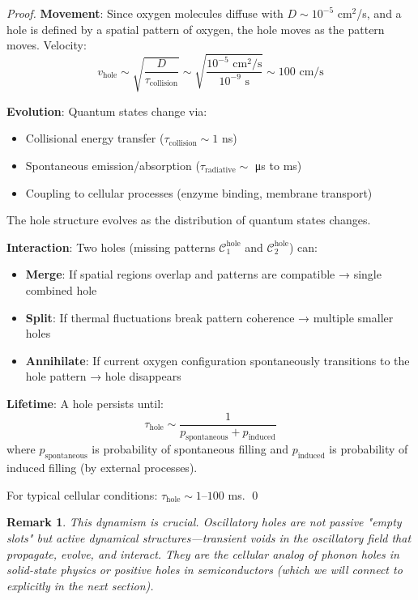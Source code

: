 \documentclass[12pt,a4paper]{article}
\newtheorem{remark}{Remark}
\begin{document}
\begin{proof}
\textbf{Movement}: Since oxygen molecules diffuse with $D \sim 10^{-5}$ cm$^2$/s, and a hole is defined by a spatial pattern of oxygen, the hole moves as the pattern moves. Velocity:
\begin{equation}
v_{\text{hole}} \sim \sqrt{\frac{D}{\tau_{\text{collision}}}} \sim \sqrt{\frac{10^{-5} \text{ cm}^2/\text{s}}{10^{-9} \text{ s}}} \sim 100 \text{ cm/s}
\end{equation}

\textbf{Evolution}: Quantum states change via:
\begin{itemize}
\item Collisional energy transfer ($\tau_{\text{collision}} \sim 1$ ns)
\item Spontaneous emission/absorption ($\tau_{\text{radiative}} \sim$ μs to ms)
\item Coupling to cellular processes (enzyme binding, membrane transport)
\end{itemize}

The hole structure evolves as the distribution of quantum states changes.

\textbf{Interaction}: Two holes (missing patterns $\mathcal{C}_1^{\text{hole}}$ and $\mathcal{C}_2^{\text{hole}}$) can:
\begin{itemize}
\item \textbf{Merge}: If spatial regions overlap and patterns are compatible → single combined hole
\item \textbf{Split}: If thermal fluctuations break pattern coherence → multiple smaller holes
\item \textbf{Annihilate}: If current oxygen configuration spontaneously transitions to the hole pattern → hole disappears
\end{itemize}

\textbf{Lifetime}: A hole persists until:
\begin{equation}
\tau_{\text{hole}} \sim \frac{1}{p_{\text{spontaneous}} + p_{\text{induced}}}
\end{equation}
where $p_{\text{spontaneous}}$ is probability of spontaneous filling and $p_{\text{induced}}$ is probability of induced filling (by external processes).

For typical cellular conditions: $\tau_{\text{hole}} \sim 1$--$100$ ms. \qed
\end{proof}

\begin{remark}
This dynamism is crucial. Oscillatory holes are not passive "empty slots" but active dynamical structures—transient voids in the oscillatory field that propagate, evolve, and interact. They are the cellular analog of phonon holes in solid-state physics or positive holes in semiconductors (which we will connect to explicitly in the next section).
\end{remark}
\end{document}
